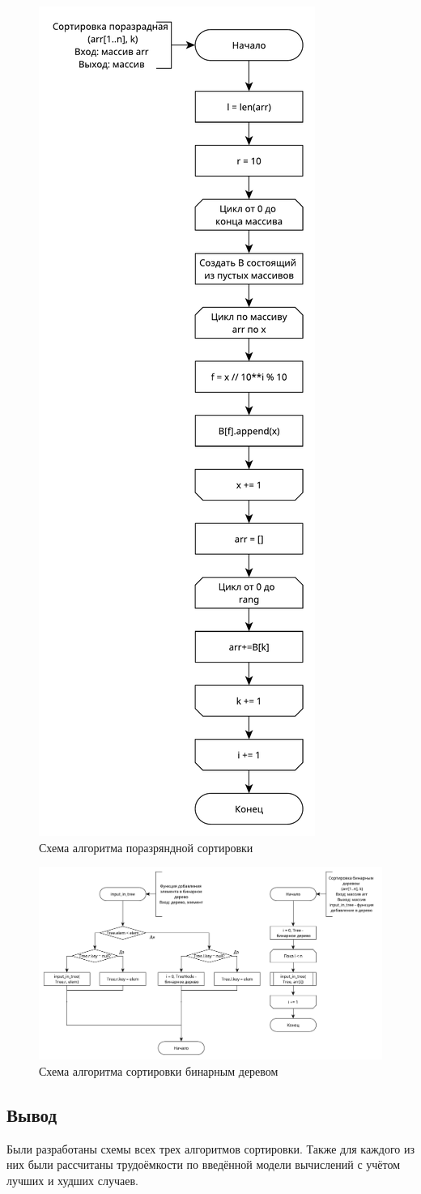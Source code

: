 \begin{figure}[ht!]
	\centering
	\includegraphics[width=0.45\linewidth]{assets/range.pdf}
	\caption{Схема алгоритма поразряндной сортировки}
	\label{fig:win-2}
\end{figure}

\begin{figure}[ht!]
	\centering
	\includegraphics[width=1\linewidth]{assets/bintree.pdf}
	\caption{Схема алгоритма сортировки бинарным деревом}
	\label{fig:alg}
\end{figure}



\subsection{Вывод}
Были разработаны схемы всех трех алгоритмов сортировки. Также для каждого из них были рассчитаны трудоёмкости по введённой модели вычислений с учётом лучших и худших случаев.